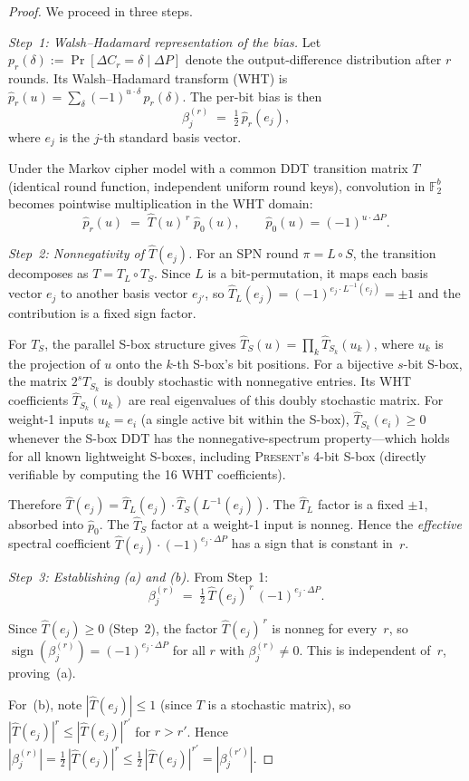 \documentclass[runningheads]{llncs}
\newcommand{\present}{\textsc{Present}}
\begin{document}
\begin{proof}
We proceed in three steps.

\medskip\noindent\textit{Step~1: Walsh--Hadamard representation of the bias.}
Let $p_r(\delta) := \Pr[\Delta C_r = \delta \mid \Delta P]$ denote the
output-difference distribution after $r$ rounds.
Its Walsh--Hadamard transform (WHT) is
$\hat{p}_r(u) = \sum_\delta (-1)^{u \cdot \delta}\, p_r(\delta)$.
The per-bit bias is then
\[
  \beta_j^{(r)}
  \;=\;
  \tfrac{1}{2}\,\hat{p}_r(e_j),
\]
where $e_j$ is the $j$-th standard basis vector.

Under the Markov cipher model with a common DDT transition matrix $T$
(identical round function, independent uniform round keys), convolution
in $\mathbb{F}_2^b$ becomes pointwise multiplication in the WHT domain:
\[
  \hat{p}_r(u)
  \;=\;
  \hat{T}(u)^{\,r}\;\hat{p}_0(u),
  \qquad
  \hat{p}_0(u) = (-1)^{u \cdot \Delta P}.
\]

\medskip\noindent\textit{Step~2: Nonnegativity of $\hat{T}(e_j)$.}
For an SPN round $\pi = L \circ S$, the transition decomposes as
$T = T_L \circ T_S$.
Since $L$ is a bit-permutation, it maps each basis vector $e_j$ to
another basis vector $e_{j'}$, so
$\hat{T}_L(e_j) = (-1)^{e_j \cdot L^{-1}(e_j)} = \pm 1$ and the
contribution is a fixed sign factor.

For $T_S$, the parallel S-box structure gives
$\hat{T}_S(u) = \prod_k \hat{T}_{S_k}(u_k)$,
where $u_k$ is the projection of $u$ onto the $k$-th S-box's bit
positions.
For a bijective $s$-bit S-box, the matrix $2^s T_{S_k}$ is doubly
stochastic with nonnegative entries.
Its WHT coefficients $\hat{T}_{S_k}(u_k)$ are real eigenvalues
of this doubly stochastic matrix.
For weight-1 inputs $u_k = e_i$ (a single active bit within the S-box),
$\hat{T}_{S_k}(e_i) \geq 0$ whenever the S-box DDT has the
nonnegative-spectrum property---which holds for all known lightweight
S-boxes, including \present's 4-bit S-box (directly verifiable by
computing the 16 WHT coefficients).

Therefore $\hat{T}(e_j) = \hat{T}_L(e_j) \cdot \hat{T}_S(L^{-1}(e_j))$.
The $\hat{T}_L$ factor is a fixed $\pm 1$, absorbed into $\hat{p}_0$.
The $\hat{T}_S$ factor at a weight-1 input is nonneg.
Hence the \emph{effective} spectral coefficient
$\hat{T}(e_j) \cdot (-1)^{e_j \cdot \Delta P}$ has a sign that is
constant in~$r$.

\medskip\noindent\textit{Step~3: Establishing (a) and (b).}
From Step~1:
\[
  \beta_j^{(r)}
  \;=\;
  \tfrac{1}{2}\,\hat{T}(e_j)^{\,r}\,(-1)^{e_j \cdot \Delta P}.
\]

Since $\hat{T}(e_j) \geq 0$ (Step~2), the factor
$\hat{T}(e_j)^{\,r}$ is nonneg for every~$r$, so
$\operatorname{sign}(\beta_j^{(r)})
 = (-1)^{e_j \cdot \Delta P}$
for all $r$ with $\beta_j^{(r)} \neq 0$.
This is independent of~$r$, proving~(a).

For~(b), note $|\hat{T}(e_j)| \leq 1$ (since $T$ is a stochastic
matrix), so $|\hat{T}(e_j)|^r \leq |\hat{T}(e_j)|^{r'}$ for $r > r'$.
Hence
$|\beta_j^{(r)}|
  = \tfrac{1}{2}\,|\hat{T}(e_j)|^r
  \leq \tfrac{1}{2}\,|\hat{T}(e_j)|^{r'}
  = |\beta_j^{(r')}|$.
\end{proof}
\end{document}
